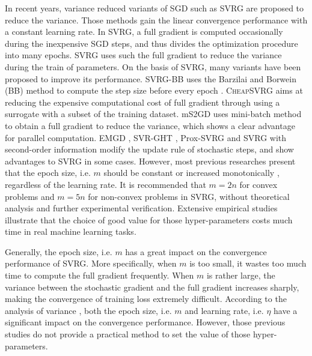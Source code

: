 \documentclass[conference]{IEEEtran}
\begin{document}
In recent years, variance reduced variants of SGD such as SVRG \citep{Johnson:9MAvkbgy}  are proposed to reduce the variance. Those methods gain the linear convergence performance with a constant learning rate. In SVRG, a full gradient is computed occasionally during the inexpensive SGD steps, and thus divides the optimization procedure into many epochs. SVRG uses such the full gradient to reduce the variance during the train of parameters. On the basis of SVRG, many variants have been proposed to improve its performance.
SVRG-BB \citep{Tan2016Barzilai} uses the Barzilai and Borwein (BB) method   to compute the step size before every epoch \citep{Barzilai1988Two}. 
\textsc{CheapSVRG} \citep{Shah2016Trading}  aims at reducing the expensive computational cost of full gradient  through using a surrogate with a subset of the training dataset. 
mS2GD \citep{Liu:2015bx} uses mini-batch method to obtain a full gradient to reduce the variance, which shows a clear advantage for  parallel computation.  EMGD \citep{Zhang2013Linear}, SVR-GHT \citep{Li:2016vh}, Prox-SVRG \citep{Xiao:2014vw} and SVRG with second-order information \citep{KolteAccelerating} modify the update rule of stochastic steps, and show advantages to SVRG in some cases.  However,  most previous researches present that the epoch size, i.e. $m$ should be constant \citep{Johnson:9MAvkbgy, Tan2016Barzilai, Shah2016Trading} or increased monotonically \citep{Liu:2015bx},  regardless of the learning rate. It is recommended that $m = 2n$ for convex problems and $m = 5n$ for non-convex problems in SVRG, without theoretical analysis and further experimental verification. Extensive empirical studies illustrate that the choice of good value for those hyper-parameters costs much time in real machine learning tasks.  

Generally, the epoch size, i.e. $m$ has a great impact on the convergence performance of SVRG.  More specifically, when $m$ is too small, it wastes too much time to compute the full gradient frequently. When $m$ is rather large, the variance between the stochastic gradient and the full gradient increases sharply, making the convergence of training loss extremely difficult. According to the analysis of variance \cite{AllenZhu:2016up}, both the epoch size, i.e. $m$ and learning rate, i.e. $\eta$ have a significant impact on the convergence performance.  However, those previous studies do not provide a practical method to set the value of those hyper-parameters. 
\end{document}
